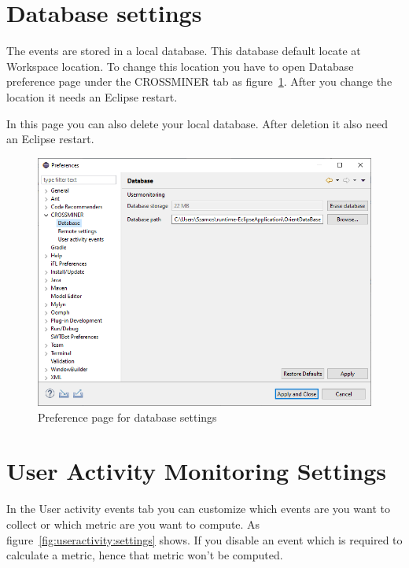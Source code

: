 \documentclass[11pt,a4paper]{book}
\begin{document}
\section{Database settings}

The events are stored in a local database. This database default locate at Workspace location. To change this location you have to open Database preference page under the CROSSMINER tab as figure~\ref{fig:database:settings}. After you change the location it needs an Eclipse restart.

In this page you can also delete your local database. After deletion it also need an Eclipse restart.

\begin{figure}[h]
	\centering
	\includegraphics[width=\linewidth]{pic/database_settings.png}
	\caption{Preference page for database settings}
	\label{fig:database:settings}
\end{figure}

\section{User Activity Monitoring Settings}

In the User activity events tab you can customize which events are you want to collect or which metric are you want to compute. As figure~\ref{fig:useractivity:settings} shows. If you disable an event which is required to calculate a metric, hence that metric won't be computed.
\end{document}
